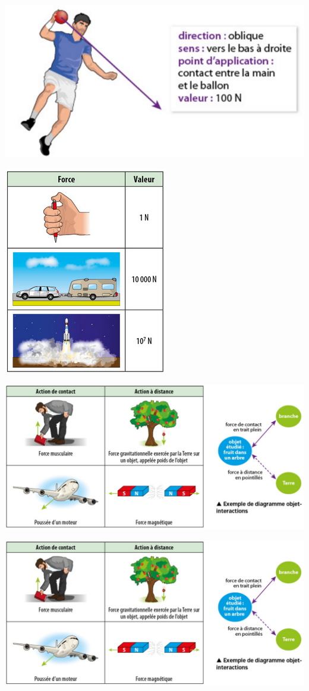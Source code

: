 \documentclass[12pt,a4paper]{article}
\begin{document}
\begin{multicols}{2}
	\begin{center}
		\includegraphics[scale=0.6]{ex_force}
	\end{center}
	
	\begin{center}
		\includegraphics[scale=0.6]{og_valeurs}
	\end{center}
\end{multicols}

\newpage

\begin{center}
	\includegraphics[scale=0.6]{ex_actions_doi}
\end{center}

\begin{center}
	\includegraphics[scale=0.6]{ex_actions_doi}
\end{center}
\end{document}
